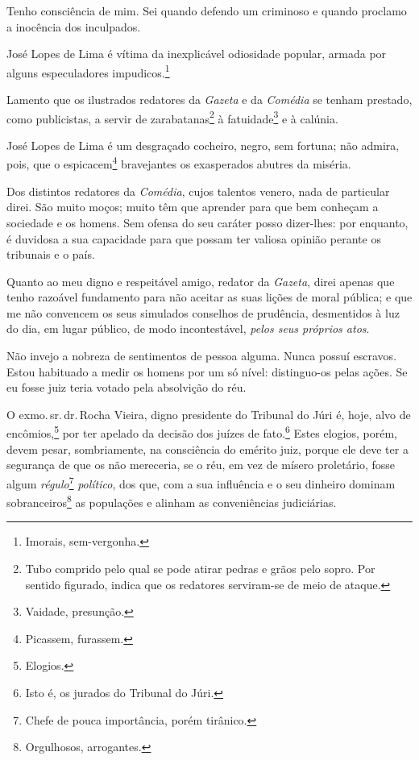 Tenho consciência de mim. Sei quando defendo um criminoso e quando
proclamo a inocência dos inculpados.

José Lopes de Lima é vítima da inexplicável odiosidade popular, armada
por alguns especuladores impudicos.\footnote{Imorais, sem-vergonha.}

Lamento que os ilustrados redatores da \textit{Gazeta} e da \textit{Comédia}
se tenham prestado, como publicistas, a servir de zarabatanas\footnote{Tubo comprido pelo qual se pode atirar
    pedras e grãos pelo sopro. Por sentido figurado, indica que os
    redatores serviram-se de meio de ataque.} à fatuidade\footnote{
    Vaidade, presunção.} e à calúnia. 

José Lopes de Lima é um desgraçado cocheiro, negro, sem fortuna; não
admira, pois, que o espicacem\footnote{Picassem, furassem.}
bravejantes os exasperados abutres da miséria.

Dos distintos redatores da \textit{Comédia}, cujos talentos venero, nada
de particular direi. São muito moços; muito têm que aprender para que
bem conheçam a sociedade e os homens. Sem ofensa do seu caráter posso
dizer-lhes: por enquanto, é duvidosa a sua capacidade para que possam
ter valiosa opinião perante os tribunais e o país.

Quanto ao meu digno e respeitável amigo, redator da \textit{Gazeta}, direi
apenas que tenho razoável fundamento para não aceitar as suas lições de
moral pública; e que me não convencem os seus simulados conselhos de
prudência, desmentidos à luz do dia, em lugar público, de modo
incontestável, \emph{pelos seus próprios atos}.

Não invejo a nobreza de sentimentos de pessoa alguma. Nunca possuí
escravos. Estou habituado a medir os homens por um só nível:
distinguo-os pelas ações. Se eu fosse juiz teria votado pela absolvição
do réu.

O exmo.\,sr.\,dr.\,Rocha Vieira, digno presidente do Tribunal do Júri é,
hoje, alvo de encômios,\footnote{Elogios.} por ter apelado da decisão
dos juízes de fato.\footnote{Isto é, os jurados do Tribunal do Júri.}
Estes elogios, porém, devem pesar, sombriamente, na consciência do
emérito juiz, porque ele deve ter a segurança de que os não mereceria,
se o réu, em vez de mísero proletário, fosse algum
\emph{régulo}\footnote{Chefe de pouca importância, porém tirânico.}
\emph{político}, dos que, com a sua influência e o seu dinheiro dominam
sobranceiros\footnote{Orgulhosos, arrogantes.}
as populações e alinham as
conveniências judiciárias.

